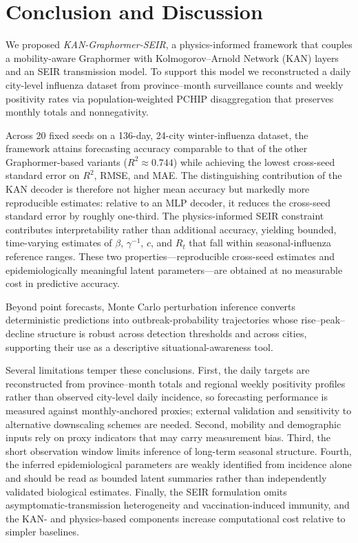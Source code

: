 \documentclass[10pt,letterpaper]{article}
\begin{document}
	
	
	
	
	\section*{Conclusion and Discussion}
	
	We proposed \textit{KAN-Graphormer-SEIR}, a physics-informed framework that couples a mobility-aware Graphormer with Kolmogorov--Arnold Network (KAN) layers and an SEIR transmission model. To support this model we reconstructed a daily city-level influenza dataset from province--month surveillance counts and weekly positivity rates via population-weighted PCHIP disaggregation that preserves monthly totals and nonnegativity.
	
	Across 20 fixed seeds on a 136-day, 24-city winter-influenza dataset, the framework attains forecasting accuracy comparable to that of the other Graphormer-based variants ($R^2 \approx 0.744$) while achieving the lowest cross-seed standard error on $R^2$, RMSE, and MAE. The distinguishing contribution of the KAN decoder is therefore not higher mean accuracy but markedly more reproducible estimates: relative to an MLP decoder, it reduces the cross-seed standard error by roughly one-third. The physics-informed SEIR constraint contributes interpretability rather than additional accuracy, yielding bounded, time-varying estimates of $\beta$, $\gamma^{-1}$, $c$, and $R_t$ that fall within seasonal-influenza reference ranges. These two properties---reproducible cross-seed estimates and epidemiologically meaningful latent parameters---are obtained at no measurable cost in predictive accuracy.
	
	Beyond point forecasts, Monte Carlo perturbation inference converts deterministic predictions into outbreak-probability trajectories whose rise--peak--decline structure is robust across detection thresholds and across cities, supporting their use as a descriptive situational-awareness tool.
	
	Several limitations temper these conclusions. First, the daily targets are reconstructed from province--month totals and regional weekly positivity profiles rather than observed city-level daily incidence, so forecasting performance is measured against monthly-anchored proxies; external validation and sensitivity to alternative downscaling schemes are needed. Second, mobility and demographic inputs rely on proxy indicators that may carry measurement bias. Third, the short observation window limits inference of long-term seasonal structure. Fourth, the inferred epidemiological parameters are weakly identified from incidence alone and should be read as bounded latent summaries rather than independently validated biological estimates. Finally, the SEIR formulation omits asymptomatic-transmission heterogeneity and vaccination-induced immunity, and the KAN- and physics-based components increase computational cost relative to simpler baselines.
	
\end{document}
